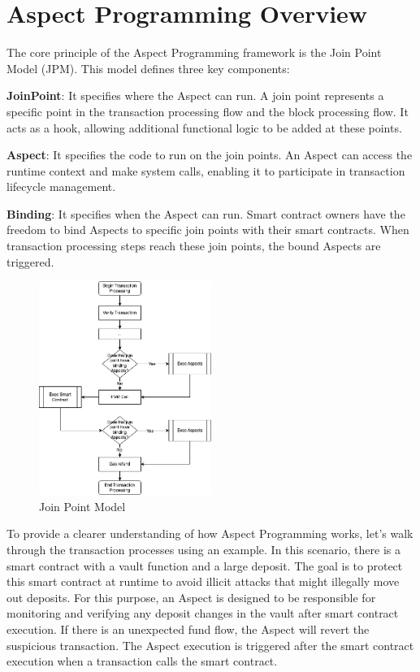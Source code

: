 
\section{Aspect Programming Overview}
The core principle of the Aspect Programming framework is the Join Point Model (JPM). This model defines three key components:

\textbf{JoinPoint}: It specifies where the Aspect can run. A join point represents a specific point in the transaction processing flow and the block processing flow. It acts as a hook, allowing additional functional logic to be added at these points.

\textbf{Aspect}: It specifies the code to run on the join points. An Aspect can access the runtime context and make system calls, enabling it to participate in transaction lifecycle management.

\textbf{Binding}: It specifies when the Aspect can run. Smart contract owners have the freedom to bind Aspects to specific join points with their smart contracts. When transaction processing steps reach these join points, the bound Aspects are triggered.

\begin{figure}[htp]
  \centering
  \includegraphics[width=0.5\textwidth]{sections/join-point-model-overview.png}
  \caption{Join Point Model}
\end{figure}

To provide a clearer understanding of how Aspect Programming works, let's walk through the transaction processes using an example. In this scenario, there is a smart contract with a vault function and a large deposit. The goal is to protect this smart contract at runtime to avoid illicit attacks that might illegally move out deposits. For this purpose, an Aspect is designed to be responsible for monitoring and verifying any deposit changes in the vault after smart contract execution. If there is an unexpected fund flow, the Aspect will revert the suspicious transaction. The Aspect execution is triggered after the smart contract execution when a transaction calls the smart contract.

